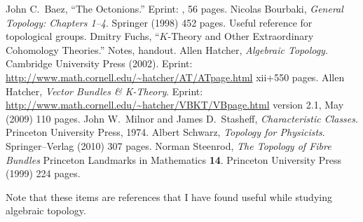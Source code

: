 \begin{thebibliography}{99}
 John C.\ Baez, \newblock
``The Octonions.''\newblock
Eprint: , 56 pages.
 Nicolas Bourbaki,
\newblock \emph{General Topology: Chapters 1--4}.
\newblock Springer (1998) 452 pages.
\newblock Useful reference for topological groups.
 Dmitry Fuchs, \newblock
``$K$-Theory and Other Extraordinary Cohomology Theories.''\newblock
Notes, handout.
 Allen Hatcher,
\newblock\emph{Algebraic Topology}.
\newblock Cambridge University Press (2002).
\newblock Eprint: \url{http://www.math.cornell.edu/~hatcher/AT/ATpage.html}
xii+550 pages.
 Allen Hatcher,
\newblock\emph{Vector Bundles \& K-Theory}.
\newblock Eprint:
\url{http://www.math.cornell.edu/~hatcher/VBKT/VBpage.html} version 2.1,
\newblock May (2009) 110 pages.
 John W.\ Milnor and James D.\ Stasheff,\newblock
\emph{Characteristic Classes}.\newblock
Princeton University Press, 1974.
 Albert Schwarz,
\newblock\emph{Topology for Physicists}.
\newblock Springer--Verlag (2010) 307 pages. 
 Norman Steenrod,
\newblock \emph{The Topology of Fibre Bundles}
\newblock Princeton Landmarks in Mathematics \textbf{14}.
\newblock Princeton University Press (1999) 224 pages.
\end{thebibliography}
Note that these items are references that I have found useful
while studying algebraic topology. 
